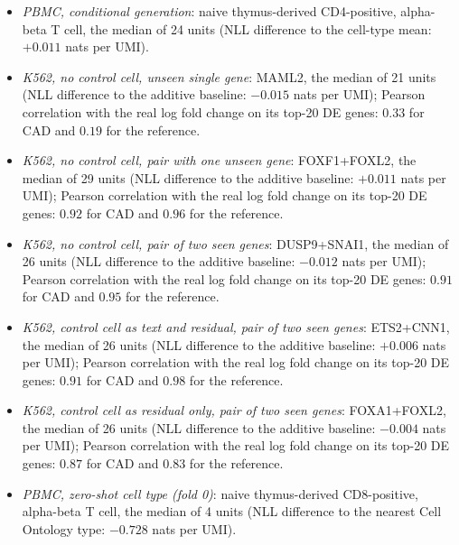 \begin{itemize}
\item[(a)] \emph{PBMC, conditional generation}: naive thymus-derived CD4-positive, alpha-beta T cell, the median of 24 units (NLL difference to the cell-type mean: $+0.011$ nats per UMI).
\item[(b)] \emph{K562, no control cell, unseen single gene}: MAML2, the median of 21 units (NLL difference to the additive baseline: $-0.015$ nats per UMI); Pearson correlation with the real log fold change on its top-20 DE genes: $0.33$ for CAD and $0.19$ for the reference.
\item[(c)] \emph{K562, no control cell, pair with one unseen gene}: FOXF1+FOXL2, the median of 29 units (NLL difference to the additive baseline: $+0.011$ nats per UMI); Pearson correlation with the real log fold change on its top-20 DE genes: $0.92$ for CAD and $0.96$ for the reference.
\item[(d)] \emph{K562, no control cell, pair of two seen genes}: DUSP9+SNAI1, the median of 26 units (NLL difference to the additive baseline: $-0.012$ nats per UMI); Pearson correlation with the real log fold change on its top-20 DE genes: $0.91$ for CAD and $0.95$ for the reference.
\item[(e)] \emph{K562, control cell as text and residual, pair of two seen genes}: ETS2+CNN1, the median of 26 units (NLL difference to the additive baseline: $+0.006$ nats per UMI); Pearson correlation with the real log fold change on its top-20 DE genes: $0.91$ for CAD and $0.98$ for the reference.
\item[(f)] \emph{K562, control cell as residual only, pair of two seen genes}: FOXA1+FOXL2, the median of 26 units (NLL difference to the additive baseline: $-0.004$ nats per UMI); Pearson correlation with the real log fold change on its top-20 DE genes: $0.87$ for CAD and $0.83$ for the reference.
\item[(g)] \emph{PBMC, zero-shot cell type (fold 0)}: naive thymus-derived CD8-positive, alpha-beta T cell, the median of 4 units (NLL difference to the nearest Cell Ontology type: $-0.728$ nats per UMI).
\end{itemize}
